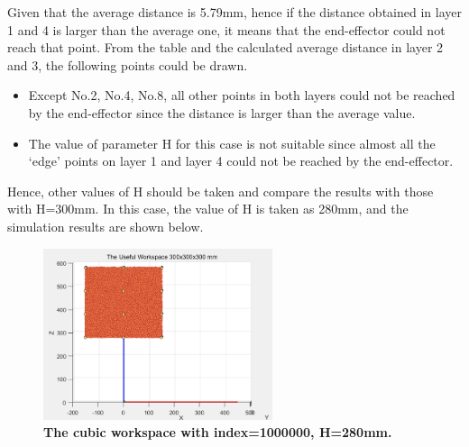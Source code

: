 Given that the average distance is 5.79mm, hence if the distance obtained in layer 1 and 4 is larger than the 
average one, it means that the end-effector could not reach that point. From the table and the calculated average 
distance in layer 2 and 3, the following points could be drawn.
\begin{itemize}
    \item Except No.2, No.4, No.8, all other points in both layers could not be reached by the end-effector since the distance is larger than the average value.
    \item The value of parameter H for this case is not suitable since almost all the ‘edge’ points on layer 1 and layer 4 could not be reached by the end-effector.
\end{itemize}
Hence, other values of H should be taken and compare the results with those with H=300mm. In this case, the value of 
H is taken as 280mm, and the simulation results are shown below.
\begin{figure}[H] %
    \centering %
    \captionsetup{labelsep=colon}
    \includegraphics[width=0.6\textwidth]{Image/Result/rect_workspace_1000000_280-580.png} 
    \caption[The cubic workspace with index=1000000, H=280mm]
    {\centering \textbf{The cubic workspace with index=1000000, H=280mm.}}
    \label{fig:rect_ws_280_580}
\end{figure}
